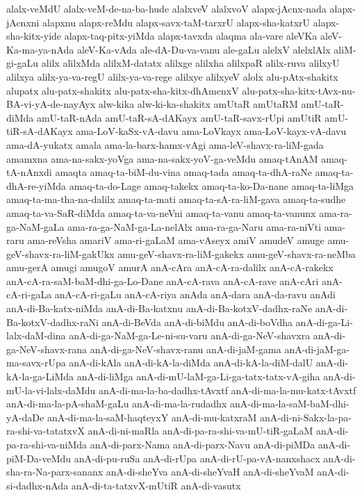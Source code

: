 {alalx-veMdU
alalx-veM-de-na-ba-hude
alalxveV
alalxvoV
alapx-jAcnx-nada
alapx-jAcnxni
alapxnu
alapx-reMdu
alapx-savx-taM-tarxrU
alapx-sha-katxrU
alapx-sha-kitx-yide
alapx-taq-pitx-yiMda
alapx-tavxda
alaqma
ala-vare
aleVKa
aleV-Ka-ma-ya-nAda
aleV-Ka-vAda
ale-dA-Du-va-vanu
ale-gaLu
alelxV
alelxlAlx
aliM-gi-gaLu
alilx
alilxMda
alilxM-datatx
alilxge
alilxha
alilxpaR
alilx-ruva
alilxyU
alilxya
alilx-ya-va-regU
alilx-ya-va-rege
alilxye
alilxyeV
alolx
alu-pAtx-shakitx
alupatx
alu-patx-shakitx
alu-patx-sha-kitx-dhAmenxV
alu-patx-sha-kitx-tAvx-nu-BA-vi-yA-de-nayAyx
alw-kika
alw-ki-ka-shakitx
amUtaR
amUtaRM
amU-taR-diMda
amU-taR-nAda
amU-taR-sA-dAKayx
amU-taR-savx-rUpi
amUtiR
amU-tiR-sA-dAKayx
ama-LoV-kaSx-vA-davu
ama-LoVkayx
ama-LoV-kayx-vA-davu
ama-dA-yukatx
amala
ama-la-barx-hamx-vAgi
ama-leV-shavx-ra-liM-gada
amamxna
ama-na-sakx-yoVga
ama-na-sakx-yoV-ga-veMdu
amaq-tAnAM
amaq-tA-nAnxdi
amaqta
amaq-ta-biM-du-vina
amaq-tada
amaq-ta-dhA-raNe
amaq-ta-dhA-re-yiMda
amaq-ta-do-Lage
amaq-takekx
amaq-ta-ko-Da-nane
amaq-ta-liMga
amaq-ta-ma-tha-na-dalilx
amaq-ta-mati
amaq-ta-sA-ra-liM-gava
amaq-ta-sudhe
amaq-ta-va-SaR-diMda
amaq-ta-va-neVni
amaq-ta-vanu
amaq-ta-vanunx
ama-ra-ga-NaM-gaLa
ama-ra-ga-NaM-ga-La-nelAlx
ama-ra-ga-Naru
ama-ra-niVti
ama-raru
ama-reVsha
amariV
ama-ri-gaLaM
ama-vAseyx
amiV
amudeV
amuge
amu-geV-shavx-ra-liM-gakUkx
amu-geV-shavx-ra-liM-gakekx
amu-geV-shavx-ra-neMba
amu-gerA
amugi
amugoV
amurA
anA-cAra
anA-cA-ra-dalilx
anA-cA-rakekx
anA-cA-ra-saM-baM-dhi-ga-Lo-Dane
anA-cA-rava
anA-cA-rave
anA-cAri
anA-cA-ri-gaLa
anA-cA-ri-gaLu
anA-cA-riya
anAda
anA-dara
anA-da-ravu
anAdi
anA-di-Ba-katx-niMda
anA-di-Ba-katxnu
anA-di-Ba-kotxV-dadhx-raNe
anA-di-Ba-kotxV-dadhx-raNi
anA-di-BeVda
anA-di-biMdu
anA-di-boVdha
anA-di-ga-Li-lalx-daM-dina
anA-di-ga-NaM-ga-Le-ni-su-varu
anA-di-ga-NeV-shavxra
anA-di-ga-NeV-shavx-rana
anA-di-ga-NeV-shavx-ranu
anA-di-jaM-gama
anA-di-jaM-ga-ma-savx-rUpa
anA-di-kAla
anA-di-kA-la-diMda
anA-di-kA-la-diM-dalU
anA-di-kA-la-ga-LiMda
anA-di-liMga
anA-di-mU-laM-ga-Li-ga-tatx-tatx-vA-giha
anA-di-mU-la-vi-lalx-daMdu
anA-di-ma-la-ba-dadhx-tAvxtf
anA-di-ma-la-mu-katx-tAvxtf
anA-di-ma-la-pA-shaM-gaLu
anA-di-ma-la-rudadhx
anA-di-ma-la-saM-baM-dhi-yA-daDe
anA-di-ma-la-saM-haqteyxY
anA-di-mu-katxraM
anA-di-ni-Sakx-la-pa-ra-shi-va-tatatxvX
anA-di-ni-maRla
anA-di-pa-ra-shi-va-mU-tiR-gaLaM
anA-di-pa-ra-shi-va-niMda
anA-di-parx-Nama
anA-di-parx-Navu
anA-di-piMDa
anA-di-piM-Da-veMdu
anA-di-pu-ruSa
anA-di-rUpa
anA-di-rU-pa-vA-nanxshacx
anA-di-sha-ra-Na-parx-sananx
anA-di-sheYva
anA-di-sheYvaH
anA-di-sheYvaM
anA-di-si-dadhx-nAda
anA-di-ta-tatxvX-mUtiR
anA-di-vasutx
}
